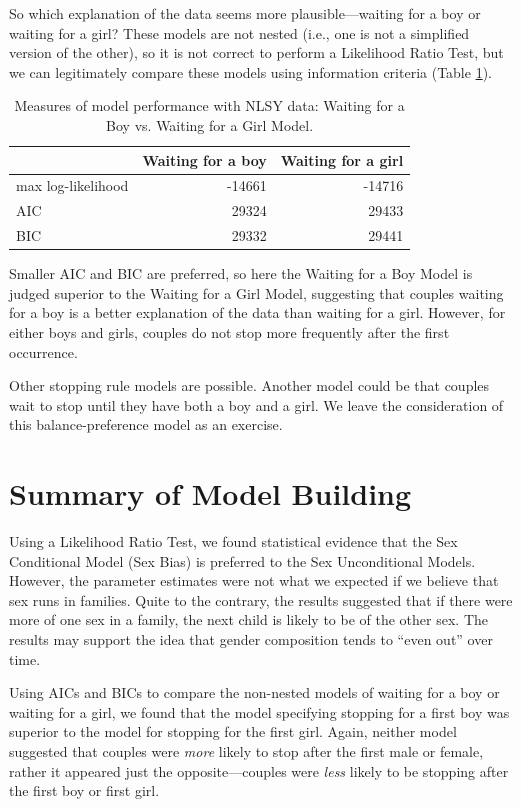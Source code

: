 \documentclass[
]{krantz}
\begin{document}
So which explanation of the data seems more plausible---waiting for a boy or waiting for a girl? These models are not nested (i.e., one is not a simplified version of the other), so it is not correct to perform a Likelihood Ratio Test, but we can legitimately compare these models using information criteria (Table \ref{tab:tab1chp2}).

\begin{table}
\centering
\caption{\label{tab:tab1chp2}Measures of model performance with NLSY data: Waiting for a Boy vs. Waiting for a Girl Model.}
\centering
\begin{tabular}[t]{lrr}
\toprule
  & Waiting for a boy & Waiting for a girl\\
\midrule
max log-likelihood & -14661 & -14716\\
AIC & 29324 & 29433\\
BIC & 29332 & 29441\\
\bottomrule
\end{tabular}
\end{table}

Smaller AIC and BIC are preferred, so here the Waiting for a Boy Model is judged superior to the Waiting for a Girl Model, suggesting that couples waiting for a boy is a better explanation of the data than waiting for a girl. However, for either boys and girls, couples do not stop more frequently after the first occurrence.

Other stopping rule models are possible. Another model could be that couples wait to stop until they have both a boy and a girl. We leave the consideration of this balance-preference model as an exercise.

\section{Summary of Model Building}\label{summary-of-model-building}

Using a Likelihood Ratio Test, we found statistical evidence that the Sex Conditional Model (Sex Bias) is preferred to the Sex Unconditional Models. However, the parameter estimates were not what we expected if we believe that sex runs in families. Quite to the contrary, the results suggested that if there were more of one sex in a family, the next child is likely to be of the other sex. The results may support the idea that gender composition tends to ``even out'' over time.

Using AICs and BICs to compare the non-nested models of waiting for a boy or waiting for a girl, we found that the model specifying stopping for a first boy was superior to the model for stopping for the first girl. Again, neither model suggested that couples were \emph{more} likely to stop after the first male or female, rather it appeared just the opposite---couples were \emph{less} likely to be stopping after the first boy or first girl.
\end{document}

